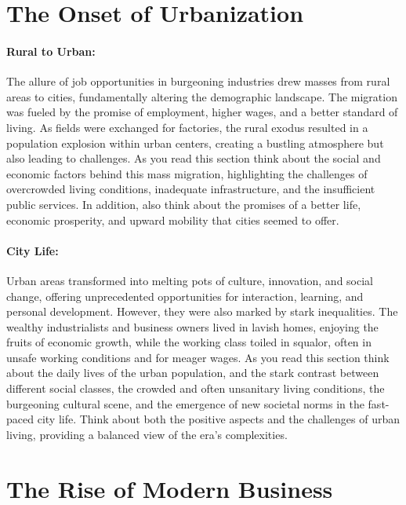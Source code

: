 \documentclass[a4paper,12pt]{book}
\begin{document}
\section*{The Onset of Urbanization}

\paragraph{Rural to Urban:}
The allure of job opportunities in burgeoning industries drew masses from rural areas to cities, fundamentally altering the demographic landscape. The migration was fueled by the promise of employment, higher wages, and a better standard of living. As fields were exchanged for factories, the rural exodus resulted in a population explosion within urban centers, creating a bustling atmosphere but also leading to challenges. As you read this section think about the social and economic factors behind this mass migration, highlighting the challenges of overcrowded living conditions, inadequate infrastructure, and the insufficient public services. In addition, also think about the promises of a better life, economic prosperity, and upward mobility that cities seemed to offer.

\paragraph{City Life:}
Urban areas transformed into melting pots of culture, innovation, and social change, offering unprecedented opportunities for interaction, learning, and personal development. However, they were also marked by stark inequalities. The wealthy industrialists and business owners lived in lavish homes, enjoying the fruits of economic growth, while the working class toiled in squalor, often in unsafe working conditions and for meager wages. As you read this section think about the daily lives of the urban population, and the stark contrast between different social classes, the crowded and often unsanitary living conditions, the burgeoning cultural scene, and the emergence of new societal norms in the fast-paced city life. Think about both the positive aspects and the challenges of urban living, providing a balanced view of the era’s complexities.

\section*{The Rise of Modern Business}
\end{document}
